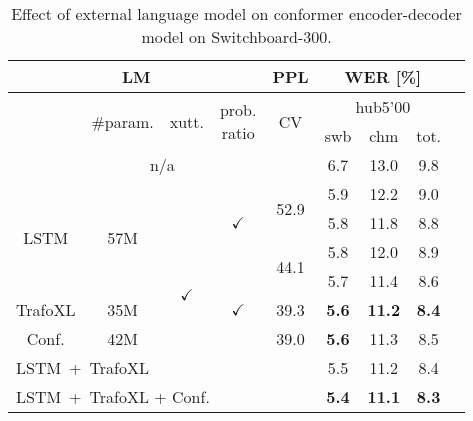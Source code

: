 \documentclass[a4paper]{article}
\begin{document}
\begin{table}
  \eightpt
  \centering
  \caption{Effect of external language model on conformer encoder-decoder model on Switchboard-300.}
  \vspace{-3.5mm}
  \begin{tabular}{|@{}c@{}|@{}c@{}|@{}c@{}|@{}c@{}|@{}c@{}|c|c|c|c|}
    \hline
 \multicolumn{4}{|c|}{LM}      &  PPL & \multicolumn{3}{c|}{WER [\%]}     \\ \hline
         & \multirow{2}{*}{\#param.} &  \multirow{2}{*}{xutt.} &  \multirow{2}{*}{\parbox{6mm}{prob.\\ratio}} & \multirow{2}{*}{CV}  & \multicolumn{3}{c|}{hub5'00} \\ \cline{6-8}
\hspace{12mm} & \hspace{11mm} & \hspace{7mm} & \hspace{8mm} & \hspace{8mm} &  swb    &    chm     & tot.   \\
\hline
\hline
         \multicolumn{5}{|c|}{n/a}             & 6.7      & 13.0       & 9.8  \\
\hline                                           
\hline
\multirow{4}{*}{LSTM}  &  \multirow{4}{*}{57M} &              &              & \multirow{2}{*}{52.9} & 5.9      & 12.2    & 9.0   \\ \cline{4-4}\cline{6-8}
         &           &              & $\checkmark$ &      & 5.8      & 11.8    & 8.8   \\ \cline{3-5}\cline{6-8}
         &           & \multirow{4}{*}{$\checkmark$} &              & \multirow{2}{*}{44.1} & 5.8      & 12.0    & 8.9   \\
         \cline{4-4}\cline{6-8}
         &           &              & \multirow{3}{*}{$\checkmark$} &      & 5.7      & 11.4    & 8.6   \\  \cline{1-2}\cline{5-8}
TrafoXL &  35M      &              &              & 39.3 & \bf 5.6      & \bf 11.2    & \bf 8.4   \\ \cline{1-2}\cline{5-8}
Conf.    &  42M      &              &              & 39.0 & \bf 5.6      & 11.3    & 8.5   \\
\hline
\hline
\multicolumn{5}{|l|}{LSTM\ +\ TrafoXL}                   & 5.5      & 11.2    & 8.4   \\ \cline{1-8}
\multicolumn{5}{|l|}{LSTM\ +\ TrafoXL + Conf.}           & \bf 5.4      & \bf 11.1    & \bf 8.3   \\
\hline
\end{tabular}                              
\label{tab:lm1}
\vspace{-5mm}
\end{table}
\end{document}
